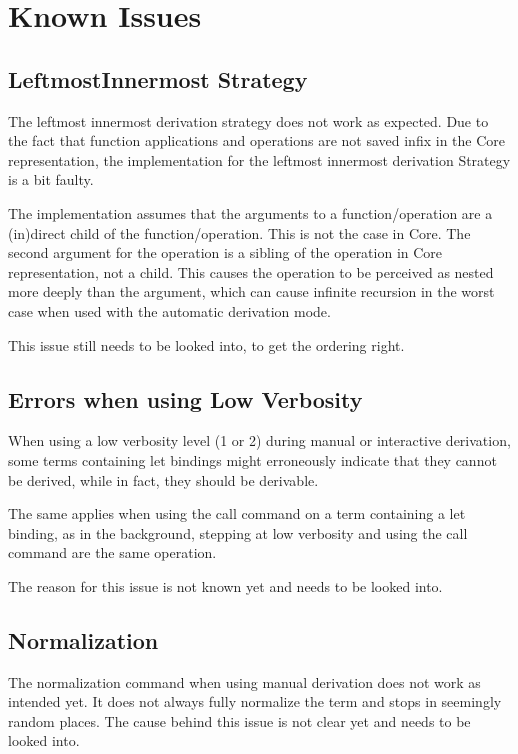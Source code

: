 \section{Known Issues}

\subsection{LeftmostInnermost Strategy}
The leftmost innermost derivation strategy does not work as expected.
Due to the fact that function applications and operations are not saved infix in the Core representation,
the implementation for the leftmost innermost derivation Strategy is a bit faulty.

The implementation assumes that the arguments to a function/operation are a (in)direct child of the function/operation.
This is not the case in Core.
The second argument for the operation is a sibling of the operation in Core representation, not a child.
This causes the operation to be perceived as nested more deeply than the argument,
which can cause infinite recursion in the worst case when used with the automatic derivation mode.

This issue still needs to be looked into,
to get the ordering right.

\subsection{Errors when using Low Verbosity}
When using a low verbosity level (1 or 2) during manual or interactive derivation,
some terms containing let bindings might erroneously indicate that they cannot be derived, 
while in fact,
they should be derivable.

The same applies when using the call command on a term containing a let binding,
as in the background,
stepping at low verbosity and using the call command are the same operation.

The reason for this issue is not known yet and needs to be looked into.


\subsection{Normalization}
The normalization command when using manual derivation does not work as intended yet.
It does not always fully normalize the term and stops in seemingly random places.
The cause behind this issue is not clear yet and needs to be looked into.
